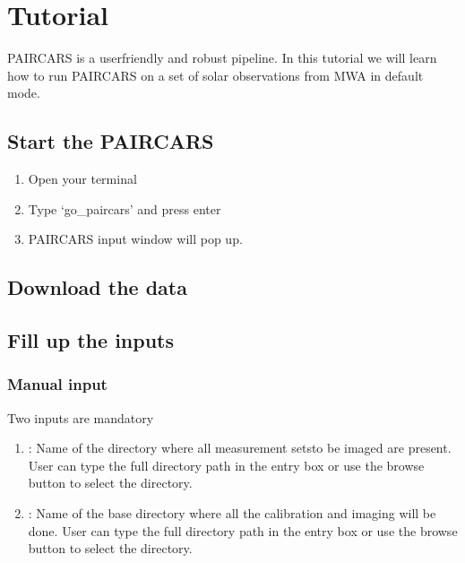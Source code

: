 \documentclass[letterpaper,10pt,english]{sphinxmanual}
\begin{document}
\chapter{Tutorial}
\label{\detokenize{tut:tutorial}}\label{\detokenize{tut::doc}}
\sphinxAtStartPar
P\sphinxhyphen{}AIRCARS is a user\sphinxhyphen{}friendly and robust pipeline. In this tutorial we will learn how to run P\sphinxhyphen{}AIRCARS on a set of solar observations from MWA in default mode.


\section{Start the P\sphinxhyphen{}AIRCARS}
\label{\detokenize{tut:start-the-p-aircars}}\begin{enumerate}
%
\item {} 
\sphinxAtStartPar
Open your terminal

\item {} 
\sphinxAtStartPar
Type ‘go\_paircars’ and press enter

\sphinxAtStartPar
{}

\item {} 
\sphinxAtStartPar
P\sphinxhyphen{}AIRCARS input window will pop up.

\end{enumerate}

\noindent{}


\section{Download the data}
\label{\detokenize{tut:download-the-data}}

\section{Fill up the inputs}
\label{\detokenize{tut:fill-up-the-inputs}}

\subsection{Manual input}
\label{\detokenize{tut:manual-input}}
\sphinxAtStartPar
Two inputs are mandatory
\begin{enumerate}
%
\item {} 
\sphinxAtStartPar
{} : Name of the directory where all measurement setsto be imaged are present. User can type the full directory path in the entry box or use the browse button to select the directory.

\item {} 
\sphinxAtStartPar
{} : Name of the base directory where all the calibration and imaging will be done. User can type the full directory path in the entry box or use the browse button to select the directory.

\end{enumerate}
\end{document}
